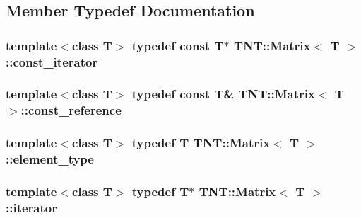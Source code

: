 \subsection{Member Typedef Documentation}
\hypertarget{classTNT_1_1Matrix_a39334142ce0b5ee917e7b222a6b5637b}{
\subsubsection[{const\-\_\-iterator}]{\setlength{\rightskip}{0pt plus 5cm}template$<$class T$>$ typedef const T$\ast$ {\bf T\-N\-T\-::\-Matrix}$<$ T $>$\-::{\bf const\-\_\-iterator}}}\label{classTNT_1_1Matrix_a39334142ce0b5ee917e7b222a6b5637b}
\hypertarget{classTNT_1_1Matrix_a6d3ceefbf1675aad4acadac4f78ed04b}{
\subsubsection[{const\-\_\-reference}]{\setlength{\rightskip}{0pt plus 5cm}template$<$class T$>$ typedef const T\& {\bf T\-N\-T\-::\-Matrix}$<$ T $>$\-::{\bf const\-\_\-reference}}}\label{classTNT_1_1Matrix_a6d3ceefbf1675aad4acadac4f78ed04b}
\hypertarget{classTNT_1_1Matrix_a8ecf0a648bbfaf636fd78c21b35a0a4d}{
\subsubsection[{element\-\_\-type}]{\setlength{\rightskip}{0pt plus 5cm}template$<$class T$>$ typedef T {\bf T\-N\-T\-::\-Matrix}$<$ T $>$\-::{\bf element\-\_\-type}}}\label{classTNT_1_1Matrix_a8ecf0a648bbfaf636fd78c21b35a0a4d}
\hypertarget{classTNT_1_1Matrix_a8233a1d03d4cfeab1d7cfec560cd2f0c}{
\subsubsection[{iterator}]{\setlength{\rightskip}{0pt plus 5cm}template$<$class T$>$ typedef T$\ast$ {\bf T\-N\-T\-::\-Matrix}$<$ T $>$\-::{\bf iterator}}}\label{classTNT_1_1Matrix_a8233a1d03d4cfeab1d7cfec560cd2f0c}
